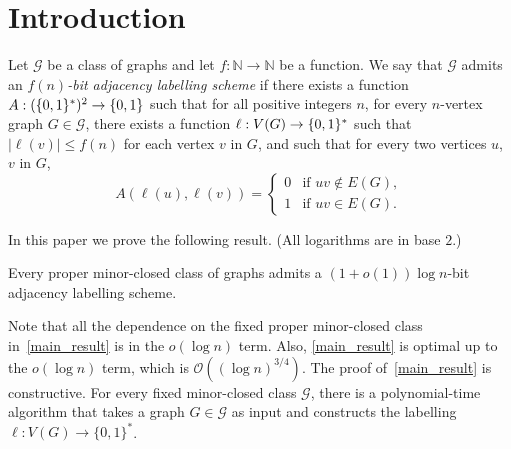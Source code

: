\documentclass{patmorin}
\renewcommand{\leq}{\leqslant}
\newcommand{\david}[1]{{\color{orange} DW: #1}}
\newcommand{\pat}[1]{\textcolor{Magenta}{PaMo: #1}}
\newcommand{\defin}[1]{\emph{\textcolor{brightmaroon}{#1}}}
\newcommand{\NN}{\mathbb{N}}
\newcommand{\Oh}{\calO}
\DeclarePairedDelimiter{\set}{\{}{\}}
\newcommand{\calG}{\mathcal{G}}
\newcommand{\calO}{\mathcal{O}}
\begin{document}
  \section{Introduction}
Let $\calG$ be a class of graphs and let $f:\NN\to\NN$ be a function.
We say that $\calG$ admits an \defin{$f(n)$-bit adjacency labelling scheme} if there exists a function $A:(\set{0,1}^*)^2\to\set{0,1}$ such that for all positive integers $n$, for every $n$-vertex graph $G\in\calG$, there exists a function $\ell: V(G)\to\set{0,1}^*$ such that
$|\ell(v)|\leq f(n)$ for each vertex $v$ in $G$, and such that
for every two vertices $u$, $v$ in $G$,
\[
A(\ell(u),\ell(v))=\begin{cases}
0&\textrm{if $uv\notin E(G)$},\\
1&\textrm{if $uv\in E(G)$}.
\end{cases}
\]

In this paper we prove the following result. (All logarithms are in base $2$.)

\begin{thm}
\label{main_result}
Every proper minor-closed class of graphs admits
a $(1+o(1))\log n$-bit adjacency labelling scheme. 
\end{thm} 


Note that all the dependence on the fixed proper minor-closed class in~\cref{main_result} is in the $o(\log n)$ term. Also, \cref{main_result} is optimal up to the $o(\log n)$ term,
which is $\Oh\left((\log n)^{3/4}\right)$.
The proof of~\cref{main_result} is constructive. For every fixed minor-closed class $\calG$, there is a polynomial-time algorithm that takes a graph $G\in\calG$ as input and constructs the labelling $\ell:V(G)\to\{0,1\}^*$.

\end{document}
